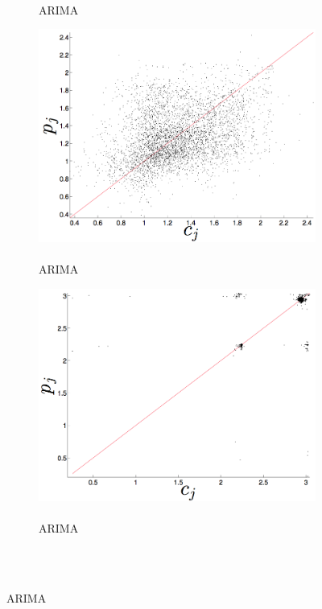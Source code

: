\begin{figure}[htbp]
\begin{subfigure}{0.6\columnwidth}
    
    \caption{\col \\ ARIMA}
    \label{fig:colARIMA}
  \end{subfigure}
  \begin{subfigure}{0.6\columnwidth}
    \includegraphics[width=\columnwidth]{figs/gccARIMAForecast.png}
    \caption{\gcc \\ ARIMA }
    \label{fig:gccARIMA}
  \end{subfigure}%
  \begin{subfigure}{0.6\columnwidth}
    \includegraphics[width=\columnwidth]{figs/svdfiveARIMAForecast.png}
    \caption{\svdfive \\ ARIMA }
    \label{fig:gccARIMA}
  \end{subfigure}%
  \\


\end{figure}
